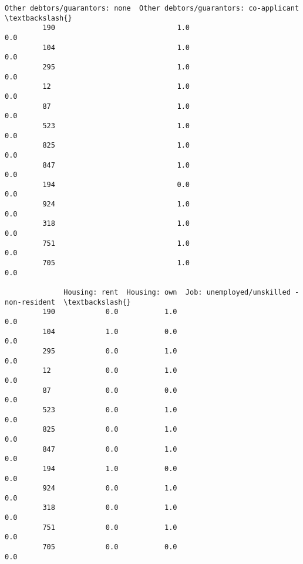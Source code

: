 \documentclass[11pt]{article}
\begin{document}
\begin{Verbatim}[commandchars=\\\{\}]
              Other debtors/guarantors: none  Other debtors/guarantors: co-applicant  \textbackslash{}
         190                             1.0                                     0.0   
         104                             1.0                                     0.0   
         295                             1.0                                     0.0   
         12                              1.0                                     0.0   
         87                              1.0                                     0.0   
         523                             1.0                                     0.0   
         825                             1.0                                     0.0   
         847                             1.0                                     0.0   
         194                             0.0                                     0.0   
         924                             1.0                                     0.0   
         318                             1.0                                     0.0   
         751                             1.0                                     0.0   
         705                             1.0                                     0.0   
         
              Housing: rent  Housing: own  Job: unemployed/unskilled - non-resident  \textbackslash{}
         190            0.0           1.0                                       0.0   
         104            1.0           0.0                                       0.0   
         295            0.0           1.0                                       0.0   
         12             0.0           1.0                                       0.0   
         87             0.0           0.0                                       0.0   
         523            0.0           1.0                                       0.0   
         825            0.0           1.0                                       0.0   
         847            0.0           1.0                                       0.0   
         194            1.0           0.0                                       0.0   
         924            0.0           1.0                                       0.0   
         318            0.0           1.0                                       0.0   
         751            0.0           1.0                                       0.0   
         705            0.0           0.0                                       0.0   
         

\end{Verbatim}
\end{document}
